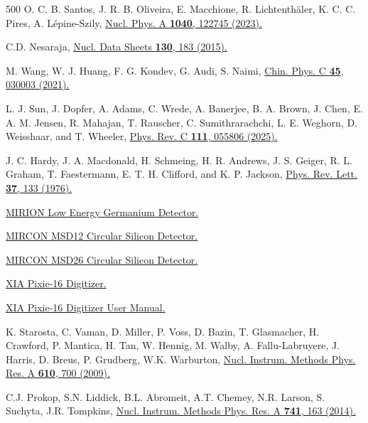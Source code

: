 \documentclass[aps,UTF8,prc,twocolumn,preprintnumbers,amsmath,amssymb,floatfix]{revtex4-2}
\begin{document}
\begin{thebibliography}{500}
O. C. B. Santos, J. R. B. Oliveira, E. Macchione, R. Lichtenth\"{a}ler, K. C. C. Pires, A. L\'{e}pine-Szily, \href{https://doi.org/10.1016/j.nuclphysa.2023.122745}{Nucl. Phys. A \textbf{1040}, 122745 (2023).}

C.D. Nesaraja, \href{https://doi.org/10.1016/j.nds.2015.11.004}{Nucl. Data Sheets \textbf{130}, 183 (2015).}

M. Wang, W. J. Huang, F. G. Kondev, G. Audi, S. Naimi, \href{https://doi.org/10.1088/1674-1137/abddaf}{Chin. Phys. C \textbf{45}, 030003 (2021).}

L. J. Sun, J. Dopfer, A. Adams, C. Wrede, A. Banerjee, B. A. Brown, J. Chen, E. A. M. Jensen, R. Mahajan, T. Rauscher, C. Sumithrarachchi, L. E. Weghorn, D. Weisshaar, and T. Wheeler, \href{https://doi.org/10.1103/PhysRevC.111.055806}{Phys. Rev. C \textbf{111}, 055806 (2025).}

J. C. Hardy, J. A. Macdonald, H. Schmeing, H. R. Andrews, J. S. Geiger, R. L. Graham, T. Faestermann, E. T. H. Clifford, and K. P. Jackson, \href{https://doi.org/10.1103/PhysRevLett.37.133}{Phys. Rev. Lett. \textbf{37}, 133 (1976).}

\href{https://www.mirion.com/products/lege-low-energy-germanium-detector}{MIRION Low Energy Germanium Detector.}

\href{http://www.micronsemiconductor.co.uk/product/msd012}{MIRCON MSD12 Circular Silicon Detector.}

\href{http://www.micronsemiconductor.co.uk/product/msd026}{MIRCON MSD26 Circular Silicon Detector.}

\href{https://xia.com/products/pixie-16/}{XIA Pixie-16 Digitizer.}

\href{https://docs.nscl.msu.edu/daq/newsite/pixie16/Pixie16_UserManual.pdf}{XIA Pixie-16 Digitizer User Manual.}

K. Starosta, C. Vaman, D. Miller, P. Voss, D. Bazin, T. Glasmacher, H. Crawford, P. Mantica, H. Tan, W. Hennig, M. Walby, A. Fallu-Labruyere, J. Harris, D. Breus, P. Grudberg, W.K. Warburton, \href{https://doi.org/10.1016/j.nima.2009.09.016}{Nucl. Instrum. Methods Phys. Res. A \textbf{610}, 700 (2009).}

C.J. Prokop, S.N. Liddick, B.L. Abromeit, A.T. Chemey, N.R. Larson, S. Suchyta, J.R. Tompkins, \href{https://doi.org/10.1016/j.nima.2013.12.044}{Nucl. Instrum. Methods Phys. Res. A \textbf{741}, 163 (2014).}


\end{thebibliography}
\end{document}
